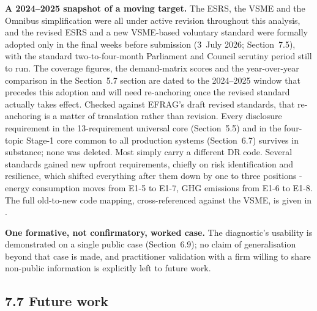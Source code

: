 \documentclass[
]{article}
\newcounter{none} %
\begin{document}
\textbf{A 2024--2025 snapshot of a moving target.} The ESRS, the VSME and the
Omnibus simplification were all under active revision throughout this
analysis, and the revised ESRS and a new VSME-based voluntary standard were
formally adopted only in the final weeks before submission (3~July 2026;
Section~7.5), with the standard two-to-four-month Parliament and Council
scrutiny period still to run. The coverage figures, the demand-matrix scores
and the year-over-year comparison in the Section~5.7 section
are dated to the 2024--2025 window that precedes this adoption and will need
re-anchoring once the revised standard actually takes effect. Checked against
EFRAG's draft revised standards, that re-anchoring is a matter of translation
rather than revision. Every disclosure requirement in the 13-requirement
universal core (Section~5.5) and in the four-topic Stage-1 core common
to all production systems (Section~6.7) survives in substance; none was deleted.
Most simply carry a different DR code. Several standards gained new upfront
requirements, chiefly on risk identification and resilience, which shifted
everything after them down by one to three positions - energy consumption moves
from E1-5 to E1-7, GHG emissions from E1-6 to E1-8. The full old-to-new code
mapping, cross-referenced against the VSME, is given in
.

\textbf{One formative, not confirmatory, worked case.} The diagnostic's
usability is demonstrated on a single public case (Section~6.9); no claim of
generalisation beyond that case is made, and practitioner validation with a
firm willing to share non-public information is explicitly left to future
work.

\subsection{7.7 Future work}\label{discussion-future-work}
\end{document}
